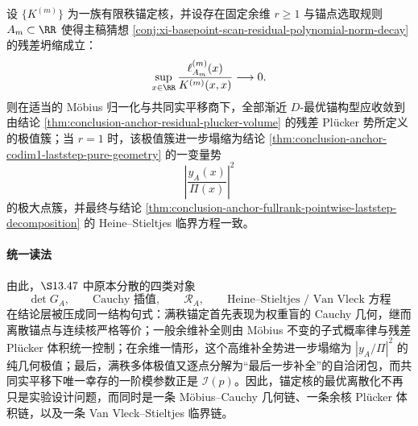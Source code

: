 \begin{conjecture}\label{conj:conclusion-anchor-residual-collapse-doptimal-stieltjes-consistency}
设 \(\{K^{(m)}\}\) 为一族有限秩锚定核，并设存在固定余维 \(r\ge 1\) 与锚点选取规则 \(A_m\subset\RR\) 使得主稿猜想 \ref{conj:xi-basepoint-scan-residual-polynomial-norm-decay} 的残差坍缩成立：
\[
\sup_{x\in\RR}\frac{\ell_{A_m}^{(m)}(x)}{K^{(m)}(x,x)}\longrightarrow 0.
\]
则在适当的 Möbius 归一化与共同实平移商下，全部渐近 \(D\)-最优锚构型应收敛到由结论 \ref{thm:conclusion-anchor-residual-plucker-volume} 的残差 Pl\"ucker 势所定义的极值簇；当 \(r=1\) 时，该极值簇进一步塌缩为结论 \ref{thm:conclusion-anchor-codim1-laststep-pure-geometry} 的一变量势
\[
\left|\frac{y_A(x)}{\Pi(x)}\right|^2
\]
的极大点簇，并最终与结论 \ref{thm:conclusion-anchor-fullrank-pointwise-laststep-decomposition} 的 Heine--Stieltjes 临界方程一致。
\end{conjecture}

\paragraph{统一读法}
由此，\(\S 13.47\) 中原本分散的四类对象
\[
\det G_A,\qquad
\text{Cauchy 插值},\qquad
\mathcal R_A,\qquad
\text{Heine--Stieltjes / Van Vleck 方程}
\]
在结论层被压成同一结构句式：满秩锚定首先表现为权重盲的 Cauchy 几何，继而离散锚点与连续核严格等价；一般余维补全则由 Möbius 不变的子式概率律与残差 Pl\"ucker 体积统一控制；在余维一情形，这个高维补全势进一步塌缩为 \(|y_A/\Pi|^2\) 的纯几何极值；最后，满秩多体极值又逐点分解为“最后一步补全”的自洽闭包，而共同实平移下唯一幸存的一阶模参数正是 \(\mathcal I(p)\)。因此，锚定核的最优离散化不再只是实验设计问题，而同时是一条 Möbius--Cauchy 几何链、一条余核 Pl\"ucker 体积链，以及一条 Van Vleck--Stieltjes 临界链。

\endinput
